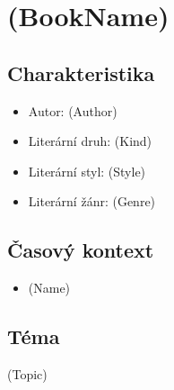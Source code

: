 \documentclass[a4paper,12pt]{article}
\begin{document}
    \section{(BookName)}
        \subsection{Charakteristika}
            \begin{itemize}
                \renewcommand\labelitemi{--}
                \item Autor: (Author)
                \item Literární druh: (Kind)
                \item Literární styl: (Style)
                \item Literární žánr: (Genre)
            \end{itemize}
     
        \subsection{Časový kontext}
            \begin{itemize}
                \renewcommand\labelitemi{--}
                \item (Name)
            \end{itemize}

        \subsection{Téma}
                (Topic)
\end{document}
